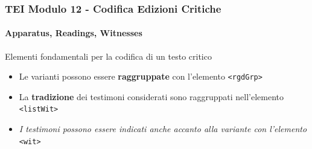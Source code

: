 \begin{frame}
    \frametitle{TEI Modulo 12 - Codifica Edizioni Critiche}
    \framesubtitle{Apparatus, Readings, Witnesses}
    \addtocounter{nframe}{1}











    \begin{block}{Elementi fondamentali per la codifica di un testo critico}
        \begin{itemize}
            \item Le varianti possono essere \textbf{raggruppate} con l'elemento \texttt{<rgdGrp>}
            \item La \textbf{tradizione} dei testimoni considerati sono raggruppati nell'elemento \texttt{<listWit>}
            \item \textit{I testimoni possono essere indicati anche accanto alla variante con l'elemento} \texttt{<wit>}
        \end{itemize}
       
    \end{block}

\end{frame}

